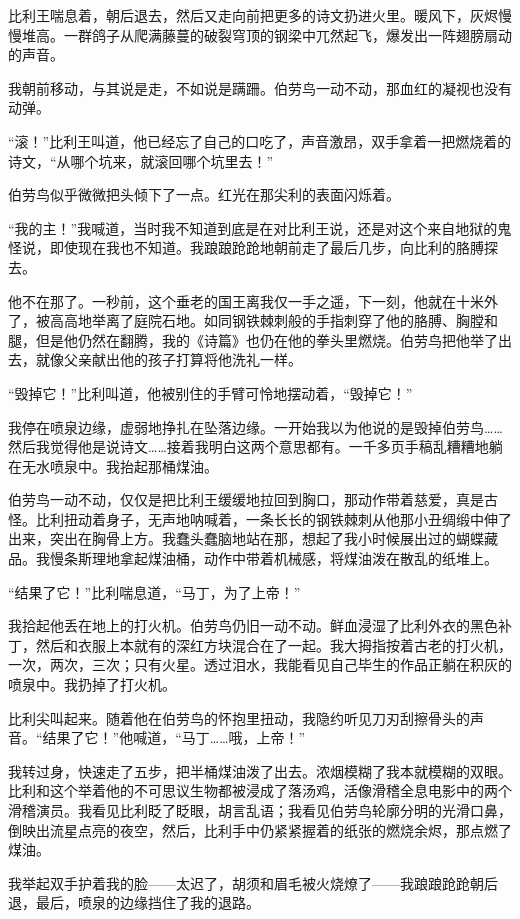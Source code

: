 \documentclass[AutoFakeBold=true]{book}
\begin{document}
比利王喘息着，朝后退去，然后又走向前把更多的诗文扔进火里。暖风下，灰烬慢慢堆高。一群鸽子从爬满藤蔓的破裂穹顶的钢梁中兀然起飞，爆发出一阵翅膀扇动的声音。

我朝前移动，与其说是走，不如说是蹒跚。伯劳鸟一动不动，那血红的凝视也没有动弹。

``滚！''比利王叫道，他已经忘了自己的口吃了，声音激昂，双手拿着一把燃烧着的诗文，``从哪个坑来，就滚回哪个坑里去！''

伯劳鸟似乎微微把头倾下了一点。红光在那尖利的表面闪烁着。

``我的主！''我喊道，当时我不知道到底是在对比利王说，还是对这个来自地狱的鬼怪说，即使现在我也不知道。我踉踉跄跄地朝前走了最后几步，向比利的胳膊探去。

他不在那了。一秒前，这个垂老的国王离我仅一手之遥，下一刻，他就在十米外了，被高高地举离了庭院石地。如同钢铁棘刺般的手指刺穿了他的胳膊、胸膛和腿，但是他仍然在翻腾，我的《诗篇》也仍在他的拳头里燃烧。伯劳鸟把他举了出去，就像父亲献出他的孩子打算将他洗礼一样。

``毁掉它！''比利叫道，他被别住的手臂可怜地摆动着，``毁掉它！''

我停在喷泉边缘，虚弱地挣扎在坠落边缘。一开始我以为他说的是毁掉伯劳鸟……然后我觉得他是说诗文……接着我明白这两个意思都有。一千多页手稿乱糟糟地躺在无水喷泉中。我抬起那桶煤油。

伯劳鸟一动不动，仅仅是把比利王缓缓地拉回到胸口，那动作带着慈爱，真是古怪。比利扭动着身子，无声地呐喊着，一条长长的钢铁棘刺从他那小丑绸缎中伸了出来，突出在胸骨上方。我蠢头蠢脑地站在那，想起了我小时候展出过的蝴蝶藏品。我慢条斯理地拿起煤油桶，动作中带着机械感，将煤油泼在散乱的纸堆上。

``结果了它！''比利喘息道，``马丁，为了上帝！''

我拾起他丢在地上的打火机。伯劳鸟仍旧一动不动。鲜血浸湿了比利外衣的黑色补丁，然后和衣服上本就有的深红方块混合在了一起。我大拇指按着古老的打火机，一次，两次，三次；只有火星。透过泪水，我能看见自己毕生的作品正躺在积灰的喷泉中。我扔掉了打火机。

比利尖叫起来。随着他在伯劳鸟的怀抱里扭动，我隐约听见刀刃刮擦骨头的声音。``结果了它！''他喊道，``马丁……哦，上帝！''

我转过身，快速走了五步，把半桶煤油泼了出去。浓烟模糊了我本就模糊的双眼。比利和这个举着他的不可思议生物都被浸成了落汤鸡，活像滑稽全息电影中的两个滑稽演员。我看见比利眨了眨眼，胡言乱语；我看见伯劳鸟轮廓分明的光滑口鼻，倒映出流星点亮的夜空，然后，比利手中仍紧紧握着的纸张的燃烧余烬，那点燃了煤油。

我举起双手护着我的脸——太迟了，胡须和眉毛被火烧燎了——我踉踉跄跄朝后退，最后，喷泉的边缘挡住了我的退路。
\end{document}
